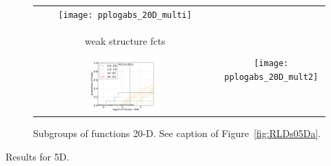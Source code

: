 \documentclass{article}
\newcommand{\ERT}{\ensuremath{\mathrm{ERT}}}
\newcommand{\Df}{\ensuremath{\Delta f}}
\newcommand{\rot}[2][2.5]{
  \hspace*{-3.5\baselineskip}%
  \begin{rotate}{90}\hspace{#1em}#2
  \end{rotate}}
\newcommand{\bbobdatapath}{ppdata/} %
\begin{document}
\begin{figure}[htbp!]
\begin{tabular}{@{}c@{}c@{}}
\texttt{[image: pplogabs\_20D\_multi]}
\\[-1ex]
\rot[1.5]{weak structure fcts}
\includegraphics[width=0.41\textwidth,trim=0 0mm 16mm 11mm, clip]{pprldistr_20D_mult2} &
\texttt{[image: pplogabs\_20D\_mult2]}
\end{tabular}
\vspace*{-0.5ex}
\caption{\label{fig:RLDs20Db}Subgroups of functions 20-D. See caption of Figure~\ref{fig:RLDs05Da}.}
\end{figure}
\begin{table}
\centering
\caption{\label{tab:ERTs05D}  Results for 5D.}
\tiny

\end{table}
\begin{table}
\centering
\caption{\label{tab:ERTs20D} Results for 20D.
}
\tiny

\end{table}

\end{document}
